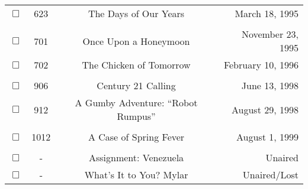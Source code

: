 \documentclass[12pt]{article}
\begin{document}
\begin{center}
\begin{longtable}[c]{cccr}
$\Box$&623&The Days of Our Years&March 18, 1995\\
\\
$\Box$&701&Once Upon a Honeymoon&November 23, 1995\\
$\Box$&702&The Chicken of Tomorrow&February 10, 1996\\
\\
$\Box$&906&Century 21 Calling&June 13, 1998\\
$\Box$&912&A Gumby Adventure: ``Robot Rumpus''&August 29, 1998\\
\\
$\Box$&1012&A Case of Spring Fever&August 1, 1999\\
\\
$\Box$&-&Assignment: Venezuela&Unaired\\
$\Box$&-&What's It to You? Mylar&Unaired/Lost\\

\end{longtable}
\end{center}
\end{document}
